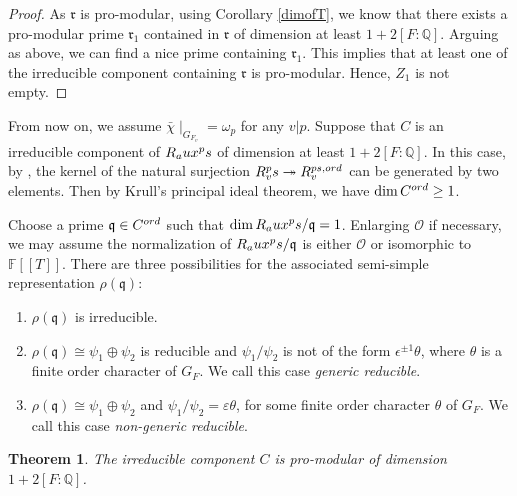 \documentclass[12pt]{amsart}
\theoremstyle{plain}
\newtheorem{thm}{Theorem}[subsection]
\theoremstyle{definition}
\theoremstyle{remark}
\begin{document}
\begin{proof}
	As $\mathfrak{r}$ is pro-modular, using Corollary \ref{dimofT}, we know that there exists a pro-modular prime $\mathfrak{r}_1$ contained in $\mathfrak{r}$ of dimension at least $1+2[F: \mathbb{Q}]$. Arguing as above, we can find a nice prime containing $\mathfrak{r}_1$. This implies that  at least one of the irreducible component containing $\mathfrak{r}$ is pro-modular. Hence, $Z_1$ is not empty.
\end{proof}

From now on, we assume $\bar{\chi}\mid_{G_{F_v}} = \omega_p$ for any $v|p$.
Suppose that $C$ is an irreducible component of $R_\textnormal{aux}^\textnormal{ps} $ of dimension at least $1+2[F:\mathbb{Q}]$. In this case, by \cite[Lemma 7.4.4]{pan2022fontaine}, the kernel of the natural surjection $ R_v^\textnormal{ps} \twoheadrightarrow R_v^{\textnormal{ps,ord}}$ can be generated by two elements. Then by Krull's principal ideal theorem, we have $\operatorname{dim} C^{\textnormal{ord}} \ge 1$. 

Choose a prime $\mathfrak{q} \in C^{\textnormal{ord}}$ such that $\dim R_\textnormal{aux}^\textnormal{ps}/\mathfrak{q}=1$. Enlarging $\mathcal{O}$ if necessary, we may assume the normalization of $R_\textnormal{aux}^\textnormal{ps}/\mathfrak{q}$ is either $\mathcal{O}$ or isomorphic to $\mathbb{F}[[T]]$. There are three possibilities for the associated semi-simple representation $\rho(\mathfrak{q})$:
\begin{enumerate}
	\item $\rho(\mathfrak{q})$ is irreducible.
	\item $\rho(\mathfrak{q})\cong\psi_1\oplus \psi_2$ is reducible  and $\psi_1/\psi_2$ is not of the form $\epsilon^{\pm 1}\theta$, where $\theta$ is a finite order character of $G_{F}$. We call this case \textit{generic reducible}.
	\item $\rho(\mathfrak{q})\cong\psi_1\oplus \psi_2$ and $\psi_1/\psi_2=\varepsilon\theta$, for some finite order character $\theta$ of $G_{F}$. We call this case \textit{non-generic reducible}.
\end{enumerate}

\begin{thm}\label{special case}
	The irreducible component $C$ is pro-modular of dimension $1+2[F:\mathbb{Q}]$.
\end{thm}
\end{document}
